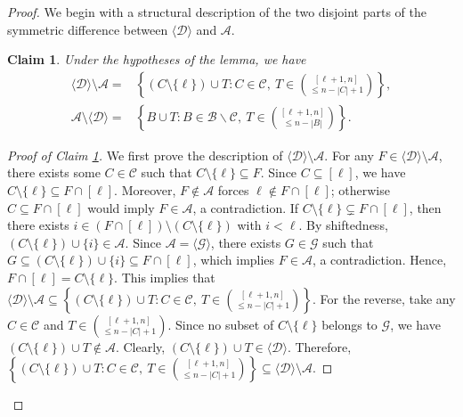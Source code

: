 \documentclass[11pt]{article}
\newtheorem{claim}{Claim}[section]
\begin{document}
\begin{proof}
We begin with a structural description of the two disjoint parts of the symmetric difference between $\langle\mathcal{D}\rangle$ and $\mathcal{A}$. 

\begin{claim}\label{cl1}
Under the hypotheses of the lemma, we have
\begin{align*}
\langle\mathcal{D}\rangle\setminus\mathcal{A}=&\left\{(C\setminus\{\ell\})\cup T: C\in\mathcal{C},\ T\in\binom{[\ell+1,n]}{\leq n-|C|+1}\right\},\\
\mathcal{A}\setminus\langle\mathcal{D}\rangle=&\left\{B\cup T: B\in\mathcal{B}\backslash \mathcal{C},\ T\in\binom{[\ell+1,n]}{\leq n-|B|}\right\}.
 \end{align*}
\end{claim}
\begin{proof}[Proof of Claim \ref{cl1}]
We first prove the description of $\langle\mathcal{D}\rangle\setminus\mathcal{A}$.
For any $F\in\langle\mathcal{D}\rangle\setminus\mathcal{A}$, there exists some $C\in\mathcal{C}$ such that $C\setminus\{\ell\}\subseteq F$.  Since $C\subseteq [\ell]$, we have $C\setminus\{\ell\}\subseteq F\cap[\ell]$.
Moreover, $F\notin\mathcal{A}$  forces  $\ell \notin F\cap[\ell]$; otherwise $C\subseteq F\cap[\ell]$ would imply $F\in\mathcal{A}$, a contradiction.
If $C\setminus\{\ell\}\subsetneq F\cap[\ell]$, then there exists $i\in(F\cap[\ell])\setminus(C\setminus\{\ell\})$ with $i<\ell$. By shiftedness, $(C\setminus\{\ell\})\cup\{i\}\in\mathcal{A}$. Since 
$\mathcal{A}= \langle\mathcal{G}\rangle$, there exists $G\in\mathcal{G}$ such that $G\subseteq(C\setminus\{\ell\})\cup\{i\}\subseteq F\cap[\ell]$, which implies  $F\in\mathcal{A}$, a contradiction. 
Hence, $F\cap[\ell]=C\setminus\{\ell\}$. This implies that
$\langle\mathcal{D}\rangle\setminus\mathcal{A}\subseteq\left\{(C\setminus\{\ell\})\cup T: C\in\mathcal{C},\ T\in\binom{[\ell+1,n]}{\leq n-|C|+1}\right\}.$  
For the reverse, take any  $C\in\mathcal{C}$ and $ T\in\binom{[\ell+1,n]}{\leq n-|C|+1}$.
Since no subset of $C\setminus\{\ell\}$ belongs to $\mathcal{G}$,
 we have $(C\setminus\{\ell\})\cup T \notin \mathcal{A}$. Clearly, $(C\setminus\{\ell\})\cup T \in \langle\mathcal{D}\rangle$. 
Therefore, 
$\left\{(C\setminus\{\ell\})\cup T: C\in\mathcal{C},\ T\in\binom{[\ell+1,n]}{\leq n-|C|+1}\right\} \subseteq\langle\mathcal{D}\rangle\setminus\mathcal{A}$.




\end{proof}
\end{proof}
\end{document}
